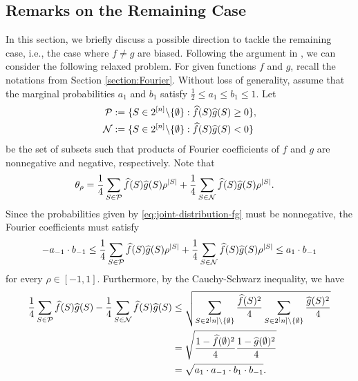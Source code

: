 \documentclass[journal,draftcls, onecolumn]{IEEEtran}
\begin{document}
\subsection{Remarks on the Remaining Case}

In this section, we briefly discuss a possible direction to tackle the remaining case, i.e., the case where $f\neq g$ are biased. 
Following the argument in \cite{PicPiaMat:18,Pichler:thesis}, 
we can consider the following relaxed problem. 
For given functions $f$ and $g$, recall the notations from Section \ref{section:Fourier}.
Without loss of generality, assume that the marginal probabilities $a_1$ and $b_1$ satisfy $\frac{1}{2} \le a_1 \le b_1 \le 1$.
Let 
\begin{align*}
{\cal P} &:= \{ S \in 2^{[n]}\backslash \{\emptyset\}: \widehat{f}(S)\widehat{g}(S) \ge 0 \}, \\
{\cal N} &:= \{ S \in 2^{[n]}\backslash \{\emptyset\}: \widehat{f}(S)\widehat{g}(S) < 0 \}
\end{align*}
be the set of subsets such that products of Fourier coefficients of $f$ and $g$ are nonnegative and negative, respectively. 
Note that
\begin{align*}
\theta_\rho &= \frac{1}{4} \sum_{S \in {\cal P}} \widehat{f}(S)\widehat{g}(S) \rho^{|S|} + \frac{1}{4} \sum_{S \in {\cal N}} \widehat{f}(S)\widehat{g}(S) \rho^{|S|}. 
\end{align*}
Since the probabilities given by \eqref{eq:joint-distribution-fg} must be nonnegative, the Fourier coefficients must satisfy
\begin{align} \label{eq:Fourier-coefficient-constraint-1}
- a_{-1}\cdot b_{-1} \le \frac{1}{4} \sum_{S \in {\cal P}} \widehat{f}(S)\widehat{g}(S) \rho^{|S|} 
+ \frac{1}{4} \sum_{S \in {\cal N}} \widehat{f}(S)\widehat{g}(S) \rho^{|S|} \le a_1 \cdot b_{-1}
\end{align}
for every $\rho \in [-1,1]$.
Furthermore, by the Cauchy-Schwarz inequality, we have
\begin{align}
\frac{1}{4} \sum_{S \in {\cal P}} \widehat{f}(S)\widehat{g}(S) - \frac{1}{4} \sum_{S \in {\cal N}} \widehat{f}(S)\widehat{g}(S)
&\le \sqrt{\sum_{ S \in 2^[n]\backslash\{\emptyset\}}\frac{ \widehat{f}(S)^2}{4}\sum_{ S \in 2^[n]\backslash\{\emptyset\}}\frac{ \widehat{g}(S)^2}{4}} \\
&= \sqrt{\frac{1-\widehat{f}(\emptyset)^2}{4} \frac{1-\widehat{g}(\emptyset)^2}{4}} \\
&= \sqrt{a_1 \cdot a_{-1} \cdot b_1 \cdot b_{-1}}. \label{eq:Fourier-coefficient-constraint-2}
\end{align}
\end{document}
